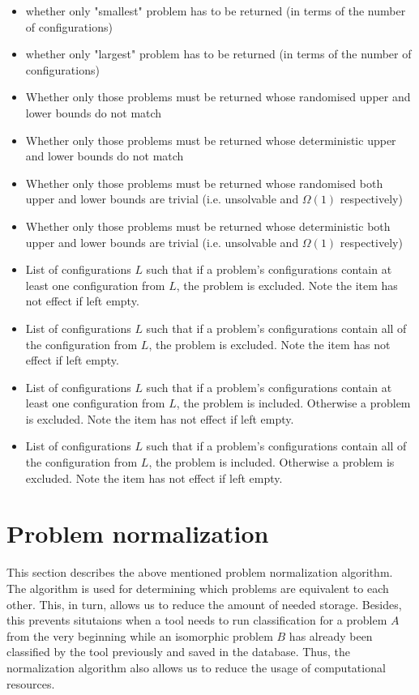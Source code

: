 \begin{itemize}
  \item whether only "smallest" problem has to be returned (in terms of the number of configurations)
  \item whether only "largest" problem has to be returned (in terms of the number of configurations)
  \item Whether only those problems must be returned whose randomised upper
  and lower bounds do not match
  \item Whether only those problems must be returned whose deterministic upper
  and lower bounds do not match
  \item Whether only those problems must be returned whose randomised both
  upper and lower bounds are trivial (i.e. unsolvable and $\Omega(1)$
  respectively)
  \item Whether only those problems must be returned whose deterministic both
  upper and lower bounds are trivial (i.e. unsolvable and $\Omega(1)$
  respectively)
  \item List of configurations $L$ such that if a problem's configurations contain at least one configuration from $L$, the problem is excluded. Note
  the item has not effect if left empty.
  \item List of configurations $L$ such that if a problem's configurations contain all of the configuration from $L$, the problem is excluded. Note
  the item has not effect if left empty.
  \item List of configurations $L$ such that if a problem's configurations contain at least one configuration from $L$, the problem is included.
  Otherwise a problem is excluded.
  Note
  the item has not effect if left empty.
  \item List of configurations $L$ such that if a problem's configurations contain all of the configuration from $L$, the problem is included.
  Otherwise a problem is excluded.
  Note
  the item has not effect if left empty.
\end{itemize}

\section{Problem normalization}
\label{section:problem-normalization}

This section describes the above mentioned problem normalization
algorithm. The algorithm is used for determining which problems
are equivalent to each other. This, in turn, allows us
to reduce the amount of needed storage. Besides, this prevents
situtaions when a tool needs to run classification for a problem $A$
from the very beginning while an isomorphic problem $B$ has already been classified
by the tool previously and saved in the database. Thus, the normalization
algorithm also allows us to reduce the usage of computational resources.

